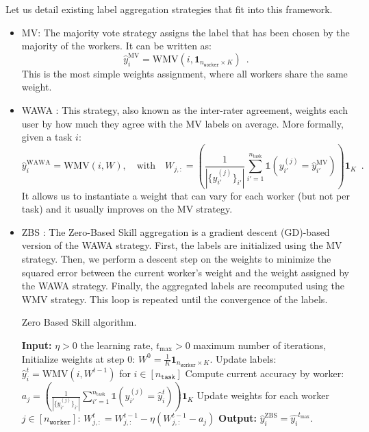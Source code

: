 \documentclass{cap2024}
\begin{document}
Let us detail existing label aggregation strategies that fit into this framework.
\begin{itemize}
  \item MV: The majority vote strategy assigns the label that has been chosen by the majority of the workers. It can be written as:
    \begin{equation}
      \label{eq:mv}
      \hat{y}_i^{\text{MV}} = \mathrm{WMV}(i,\mathbf{1}_{n_\texttt{worker}\times K})\enspace.
    \end{equation}
    This is the most simple weights assignment, where all workers share the same weight.
    \item WAWA \citep{appen_wawa_2021}: This strategy, also known as the inter-rater agreement, weights each user by how much they agree with the MV labels on average. More formally, given a task $i$:
    \begin{equation}
      \hat{y}_i^\text{WAWA}= \mathrm{WMV}\left(i,W\right),\quad
      \text{with}\quad W_{j,:} = \left(\frac{1}{|\{y_{i'}^{(j)}\}_{i'}|} \sum_{i'=1}^{n_{\mathrm{task}}} \mathds{1}\left(y_{i'}^{(j)} = \hat{y}_{i'}^\text{MV}\right)\right)\mathbf{1}_{K}\enspace.
    \end{equation}
    It allows us to instantiate a weight that can vary for each worker (but not per task) and it usually improves on the MV strategy.
    \item ZBS \citep{CrowdKit2023}: The Zero-Based Skill aggregation is a gradient descent (GD)-based version of the WAWA strategy.
    First, the labels are initialized using the MV strategy. Then, we perform a descent step on the weights to minimize the squared error between the current worker's weight and the weight assigned by the WAWA strategy. Finally, the aggregated labels are recomputed using the WMV strategy. This loop is repeated until the convergence of the labels.
    \begin{algorithm}
      \caption{Zero Based Skill algorithm.}
      \begin{algorithmic}[1]
        \State \textbf{Input:} $\eta>0$ the learning rate, $t_{\max}>0$ maximum number of iterations,
      \State Initialize weights at step $0$: $W^0=\frac{1}{K} \mathbf{1}_{n_\texttt{worker}\times K}$.
            \State Update labels: $\hat{y}_i^{t} = \mathrm{WMV}(i, W^{t-1})$ for $i\in [n_\texttt{task}]$
            \State Compute current accuracy by worker: $a_j =\left(\frac{1}{|\{y_{i'}^{(j)}\}_{i'}|} \sum_{i'=1}^{n_{\mathrm{task}}} \mathds{1}\left(y_{i'}^{(j)} = \hat{y}_i^t\right)\right)\mathbf{1}_K$
            \State Update weights for each worker $j\in [n_\texttt{worker}]$: $W^t_{j,:} = W^{t-1}_{j, :} - \eta (W^{t-1}_{j,:}-a_j)$
        \EndFor
        \State \textbf{Output:} $\hat{y}_i^\text{ZBS} = \hat{y_i}^{t_{\max}}$.
      \end{algorithmic}
      \end{algorithm}


\end{itemize}
\end{document}
